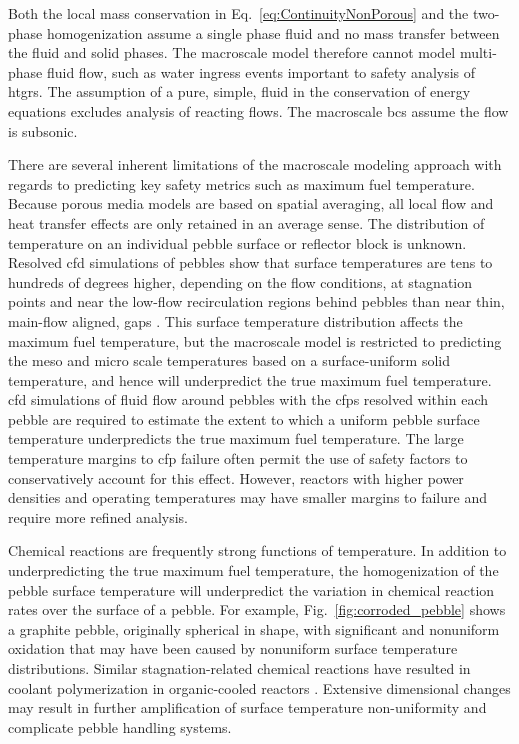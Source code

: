 Both the local mass conservation in Eq.\ \eqref{eq:ContinuityNonPorous} and the two-phase homogenization assume a single phase fluid and no mass transfer between the fluid and solid phases. The macroscale model therefore cannot model multi-phase fluid flow, such as water ingress events important to safety analysis of \glspl{htgr}. The assumption of a pure, simple, fluid in the conservation of energy equations excludes analysis of reacting flows. The macroscale \glspl{bc} assume the flow is subsonic. 

There are several inherent limitations of the macroscale modeling approach with regards to predicting key safety metrics such as maximum fuel temperature. Because porous media models are based on spatial averaging, all local flow and heat transfer effects are only retained in an average sense. The distribution of temperature on an individual pebble surface or reflector block is unknown. Resolved \gls{cfd} simulations of pebbles show that surface temperatures are tens to hundreds of degrees higher, depending on the flow conditions, at stagnation points and near the low-flow recirculation regions behind pebbles than near thin, main-flow aligned, gaps \cite{bai,ferng,ge,lee2007,song,wu2010}. This surface temperature distribution affects the maximum fuel temperature, but the macroscale model is restricted to predicting the meso and micro scale temperatures based on a surface-uniform solid temperature, and hence will underpredict the true maximum fuel temperature. \gls{cfd} simulations of fluid flow around pebbles with the \glspl{cfp} resolved within each pebble are required to estimate the extent to which a uniform pebble surface temperature underpredicts the true maximum fuel temperature. The large temperature margins to \gls{cfp} failure often permit the use of safety factors to conservatively account for this effect. However, reactors with higher power densities and operating temperatures may have smaller margins to failure and require more refined analysis.

Chemical reactions are frequently strong functions of temperature. In addition to underpredicting the true maximum fuel temperature, the homogenization of the pebble surface temperature will underpredict the variation in chemical reaction rates over the surface of a pebble. For example, Fig.\ \ref{fig:corroded_pebble} shows a graphite pebble, originally spherical in shape, with significant and nonuniform oxidation that may have been caused by nonuniform surface temperature distributions. Similar stagnation-related chemical reactions have resulted in coolant polymerization in organic-cooled reactors \cite{shirvan}. Extensive dimensional changes may result in further amplification of surface temperature non-uniformity and complicate pebble handling systems. 

